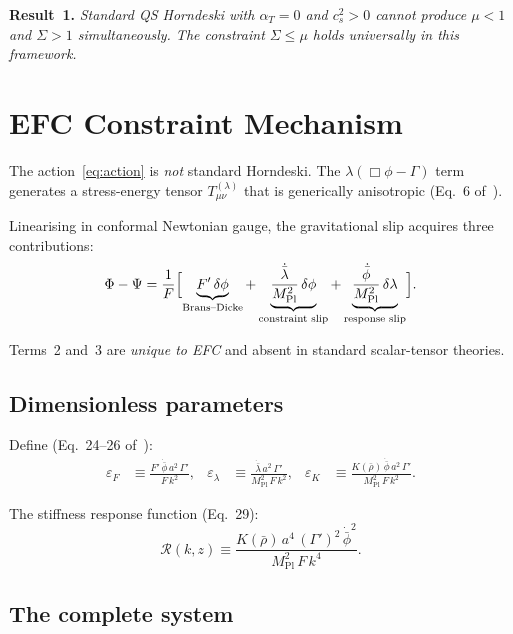 \documentclass[11pt,a4paper]{article}
\begin{document}
\textbf{Result~1.}
\emph{Standard QS Horndeski with $\alpha_T = 0$ and $c_s^2 > 0$ cannot
produce $\mu < 1$ and $\Sigma > 1$ simultaneously.  The constraint
$\Sigma \leq \mu$ holds universally in this framework.}

\newpage
\section{EFC Constraint Mechanism}

The action~\eqref{eq:action} is \emph{not} standard Horndeski.
The $\lambda(\Box\phi - \Gamma)$ term generates a stress-energy
tensor $T^{(\lambda)}_{\mu\nu}$ that is generically anisotropic
(Eq.~6 of~\cite{magnusson2026action}).

Linearising in conformal Newtonian gauge, the gravitational slip
acquires three contributions:
\begin{equation}\label{eq:slip_sources}
\Phi - \Psi = \frac{1}{F}\Bigl[
  \underbrace{F'\,\delta\phi}_{\text{Brans--Dicke}}
  + \underbrace{\frac{\dot{\bar\lambda}}{M_{\mathrm{Pl}}^2}\,\delta\phi}_{\text{constraint slip}}
  + \underbrace{\frac{\dot{\bar\phi}}{M_{\mathrm{Pl}}^2}\,\delta\lambda}_{\text{response slip}}
\Bigr].
\end{equation}

Terms~2 and~3 are \emph{unique to EFC} and absent in standard
scalar-tensor theories.

\subsection{Dimensionless parameters}

Define (Eq.~24--26 of~\cite{magnusson2026action}):
\begin{align}
\varepsilon_F &\equiv \frac{F'\,\dot{\bar\phi}\,a^2\,\Gamma'}{F\,k^2},
  &\varepsilon_\lambda &\equiv \frac{\dot{\bar\lambda}\,a^2\,\Gamma'}{M_{\mathrm{Pl}}^2\,F\,k^2},
  &\varepsilon_K &\equiv \frac{K(\bar\rho)\,\dot{\bar\phi}\,a^2\,\Gamma'}{M_{\mathrm{Pl}}^2\,F\,k^2}.
\end{align}

The stiffness response function (Eq.~29):
\begin{equation}\label{eq:R}
\mathcal{R}(k,z) \equiv \frac{K(\bar\rho)\,a^4\,(\Gamma')^2\,\dot{\bar\phi}^2}
  {M_{\mathrm{Pl}}^2\,F\,k^4}.
\end{equation}

\subsection{The complete system}
\end{document}
